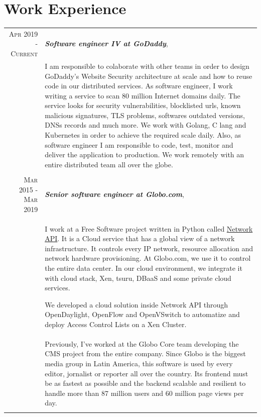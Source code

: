 \documentclass[a4paper,10pt]{article} %
\begin{document}
\section{Work Experience}

\begin{longtable}{r|p{11cm}}

\textsc{Apr 2019 - Current} & \emph{\bf Software engineer IV at GoDaddy}, \\
& \footnotesize{
    I am responsible to colaborate with other teams in order to design
    GoDaddy's Website Security architecture at scale and how to reuse code
    in our distributed services.
    As software engineer, I work  writing a service to scan
    80 million Internet domains daily. The service looks for security
    vulnerabilities, blocklisted urls, known malicious signatures,
    TLS problems, softwares outdated versions, DNSs records and much more.
    We work with Golang, C lang and Kubernetes in order to achieve the
    required scale daily. Also, as software engineer I am responsible to code,
    test, monitor and deliver the application to production.
    We work remotely with an entire distributed team all over the globe.} \\
\multicolumn{2}{c}{} \\

\textsc{Mar 2015 - Mar 2019} & \emph{\bf Senior software engineer at Globo.com}, \\
& \footnotesize{I work at a Free Software project written in Python called
	\href{https://github.com/globocom/GloboNetworkAPI}{Network API}.
    It is a Cloud service that has a global view of a network infrastructure.
    It controls every IP network, resource allocation and network
    hardware provisioning. At Globo.com, we use it to control the entire
    data center. In our cloud environment, we integrate it with cloud stack,
    Xen, tsuru, DBaaS and some private cloud services.

    We developed a cloud solution inside Network API through OpenDaylight,
    OpenFlow and OpenVSwitch to automatize and deploy Access Control Lists on a
    Xen Cluster.} \\

& \footnotesize{
    Previously, I've worked at the Globo Core team developing the CMS project
    from the entire company. Since Globo is the biggest media group in Latin
    America, this software is used by every editor, jornalist or reporter all
    over the country. Its frontend must be as fastest as possible and the
    backend scalable and resilient to handle more than 87 million users and 60
    million page views per day.} \\
\multicolumn{2}{c}{} \\


\end{longtable}
\end{document}
